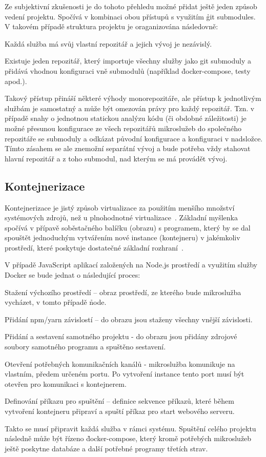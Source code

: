 Ze subjektivní zkušenosti je do tohoto přehledu možné přidat ještě jeden způsob vedení projektu.
Spočívá v kombinaci obou přístupů s využitím \h{git submodules}.
V takovém případě struktura projektu je oraganizována následovně:

\begin{ul}
   \item Každá služba má svůj vlastní repozitář a jejich vývoj je nezávislý.
   \item Existuje jeden repozitář, který importuje všechny služby jako git submoduly a přidává vhodnou konfiguraci vně submodulů (například \h{docker-compose}, testy apod.).
\end{ul}

Takový přístup přináší některé výhody monorepozitáře, ale přístup k jednotlivým službám je samostatný a může být omezován právy pro každý repozitář.
Tzn.
v případě snahy o jednotnou statickou analýzu kódu (či obdobné záležitosti) je možné přesunou konfigurace ze všech repozitářů mikroslužeb do společného repozitáře se submoduly a odkázat původní konfigurace a konfiguraci v nadsložce.
Tímto zásahem se ale znemožní separátní vývoj a bude potřeba vždy stahovat hlavní repozitář a z toho submodul, nad kterým se má provádět vývoj.



\subsection{Kontejnerizace}\label{subsec:msa-deployment-containerization}
Kontejnerizace je jistý způsob virtualizace za použitím menšího množství systémových zdrojů, než u plnohodnotné virtualizace~\cite{kontejnerizace}.
Základní myšlenka spočívá v přípavě soběstačného balíčku (obrazu) s programem, který by se dal spouštět jednoduchým vytvářením nové instance (kontejneru) v jakémkoliv prostředí, které poskytuje dostatečné základní rozhraní~\cite{dockercontainer}.

V případě JavaScript aplikací založených na Node.js prostředí a využitím služby Docker se bude jednat o následující proces:

\begin{dl}
   \item [Stažení výchozího prostředí] – obraz prostředí, ze kterého bude mikroslužba vycházet, v tomto případě \h{node}.
   \item [Přidání npm/yarn závislostí] – do obrazu jsou staženy všechny vnější závislosti.
   \item [Přidání a sestavení samotného projektu] - do obrazu jsou přidány zdrojové soubory samotného programu a spuštěno sestavení.
   \item [Otevření potřebných komunikačních kanálů] - mikroslužba komunikuje na vlastním, předem určeném portu.
   Po vytvoření instance tento port musí být otevřen pro komunikaci s kontejnerem.
   \item [Definování příkazu pro spuštění] – definice sekvence příkazů, které během vytvoření kontejneru připraví a spuští příkaz pro start webového serveru.
\end{dl}

Takto se musí připravit každá služba v rámci systému.
Spuštění celého projektu následně může být řízeno \h{docker-compose}, který kromě potřebých mikroslužeb ještě poskytne databáze a další potřebné programy třetích strav.
